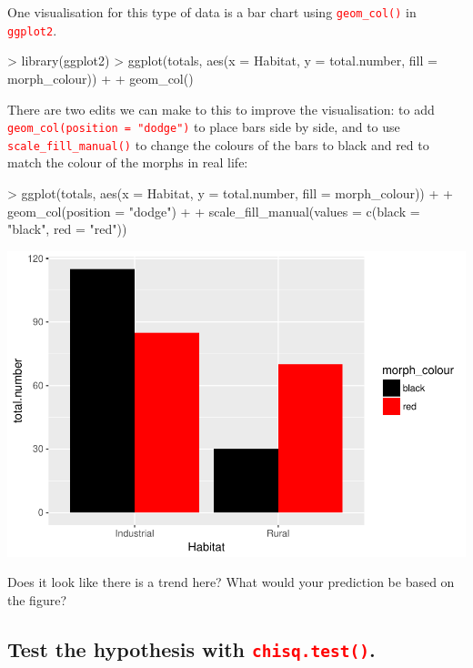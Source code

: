 \documentclass[a4paper,12pt]{article}
\newcommand\code[1]{\textcolor{red}{\texttt{#1}}}
\begin{document}
One visualisation for this type of data is a bar chart using \code{geom\_col()} in \code{ggplot2}.


\begin{shaded}
\begin{Schunk}
\begin{Sinput}
> library(ggplot2)
> ggplot(totals, aes(x = Habitat, y = total.number, fill = morph_colour)) +
+   geom_col() 
\end{Sinput}
\end{Schunk}
\end{shaded}

There are two edits we can make to this to improve the visualisation: to add \code{geom\_col(position = "dodge")} to place bars side by side, and to use \code{scale\_fill\_manual()} to change the colours of the bars to black and red to match the colour of the morphs in real life:


\begin{shaded}
\begin{Schunk}
\begin{Sinput}
> ggplot(totals, aes(x = Habitat, y = total.number, fill = morph_colour)) +
+   geom_col(position = "dodge") +
+   scale_fill_manual(values = c(black = "black", red = "red"))
\end{Sinput}
\end{Schunk}
\includegraphics{1_Stats_Course_Notes-knitr-008}
\end{shaded}

Does it look like there is a trend here? What would your prediction be based on the figure?

\subsection{Test the hypothesis with \code{chisq.test()}.}
\end{document}
